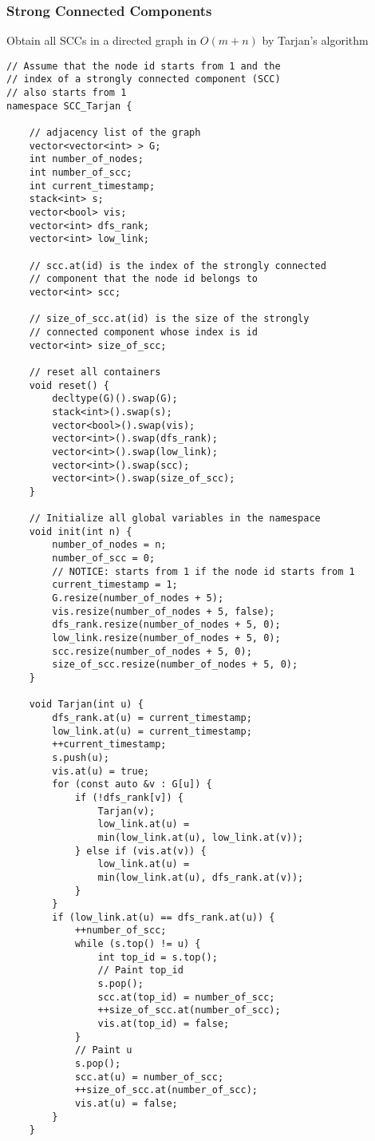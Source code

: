\documentclass[10pt]{article}{\twocolumn}
\begin{document}
\subsubsection{Strong Connected Components}
Obtain all SCCs in a directed graph in $O(m+n)$ by Tarjan's algorithm
\begin{lstlisting}
// Assume that the node id starts from 1 and the
// index of a strongly connected component (SCC) 
// also starts from 1
namespace SCC_Tarjan {

    // adjacency list of the graph
    vector<vector<int> > G;
    int number_of_nodes;
    int number_of_scc;
    int current_timestamp;
    stack<int> s;
    vector<bool> vis;
    vector<int> dfs_rank;
    vector<int> low_link;
    
    // scc.at(id) is the index of the strongly connected
    // component that the node id belongs to
    vector<int> scc;
    
    // size_of_scc.at(id) is the size of the strongly
    // connected component whose index is id
    vector<int> size_of_scc;

    // reset all containers
    void reset() {
        decltype(G)().swap(G);
        stack<int>().swap(s);
        vector<bool>().swap(vis);
        vector<int>().swap(dfs_rank);
        vector<int>().swap(low_link);
        vector<int>().swap(scc);
        vector<int>().swap(size_of_scc);
    }

    // Initialize all global variables in the namespace
    void init(int n) {
        number_of_nodes = n;
        number_of_scc = 0;
        // NOTICE: starts from 1 if the node id starts from 1
        current_timestamp = 1;
        G.resize(number_of_nodes + 5);
        vis.resize(number_of_nodes + 5, false);
        dfs_rank.resize(number_of_nodes + 5, 0);
        low_link.resize(number_of_nodes + 5, 0);
        scc.resize(number_of_nodes + 5, 0);
        size_of_scc.resize(number_of_nodes + 5, 0);
    }

    void Tarjan(int u) {
        dfs_rank.at(u) = current_timestamp;
        low_link.at(u) = current_timestamp;
        ++current_timestamp;
        s.push(u);
        vis.at(u) = true;
        for (const auto &v : G[u]) {
            if (!dfs_rank[v]) {
                Tarjan(v);
                low_link.at(u) = 
                min(low_link.at(u), low_link.at(v));
            } else if (vis.at(v)) {
                low_link.at(u) = 
                min(low_link.at(u), dfs_rank.at(v));
            }
        }
        if (low_link.at(u) == dfs_rank.at(u)) {
            ++number_of_scc;
            while (s.top() != u) {
                int top_id = s.top();
                // Paint top_id
                s.pop();
                scc.at(top_id) = number_of_scc;
                ++size_of_scc.at(number_of_scc);
                vis.at(top_id) = false;
            }
            // Paint u
            s.pop();
            scc.at(u) = number_of_scc;
            ++size_of_scc.at(number_of_scc);
            vis.at(u) = false;
        }
    }


\end{lstlisting}
\end{document}

